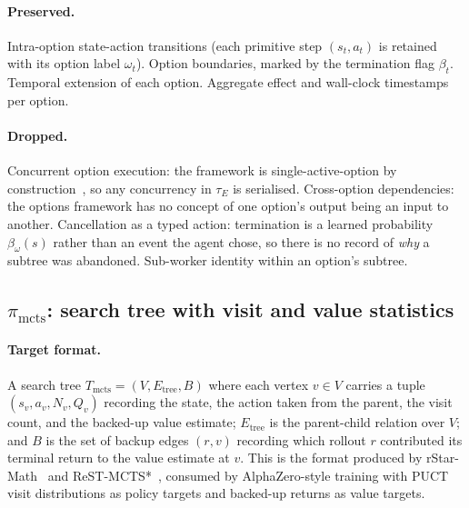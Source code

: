 \documentclass{article}
\begin{document}
\paragraph{Preserved.} Intra-option state-action transitions
(each primitive step $(s_t, a_t)$ is retained with its option
label $\omega_t$). Option boundaries, marked by the termination
flag $\beta_t$. Temporal extension of each option. Aggregate
effect and wall-clock timestamps per option.

\paragraph{Dropped.} Concurrent option execution: the framework
is single-active-option by construction~\citep{bacon2017optioncritic},
so any concurrency in $\tau_E$ is serialised. Cross-option
dependencies: the options framework has no concept of one
option's output being an input to another. Cancellation as a
typed action: termination is a learned probability $\beta_\omega(s)$
rather than an event the agent chose, so there is no record of
\emph{why} a subtree was abandoned. Sub-worker identity within
an option's subtree.

\subsection{$\pi_{\text{mcts}}$: search tree with visit and value statistics}
\label{app:proj:mcts}

\paragraph{Target format.} A search tree
$T_{\text{mcts}} = (V, E_{\text{tree}}, B)$ where each vertex
$v \in V$ carries a tuple $(s_v, a_v, N_v, Q_v)$ recording the
state, the action taken from the parent, the visit count, and
the backed-up value estimate; $E_{\text{tree}}$ is the
parent-child relation over $V$; and $B$ is the set of backup
edges $(r, v)$ recording which rollout $r$ contributed its
terminal return to the value estimate at $v$. This is the format
produced by rStar-Math~\citep{rstarmath2025} and
ReST-MCTS*~\citep{restmcts2024}, consumed by AlphaZero-style
training with PUCT visit distributions as policy targets and
backed-up returns as value targets.
\end{document}
